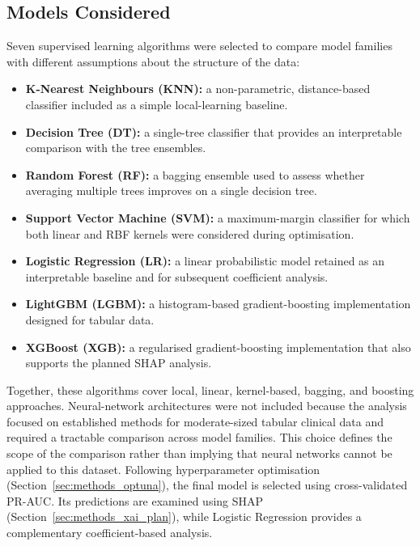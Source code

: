 \subsection{Models Considered}
\label{sec:methods_models}
Seven supervised learning algorithms were selected to compare model families with different assumptions about the structure of the data:
\begin{itemize}
  \item \textbf{K-Nearest Neighbours (\gls{KNN}):} a non-parametric, distance-based classifier included as a simple local-learning baseline.
  \item \textbf{Decision Tree (\gls{DT}):} a single-tree classifier that provides an interpretable comparison with the tree ensembles.
  \item \textbf{Random Forest (\gls{RF}):} a bagging ensemble used to assess whether averaging multiple trees improves on a single decision tree.
  \item \textbf{Support Vector Machine (\gls{SVM}):} a maximum-margin classifier for which both linear and \gls{RBF} kernels were considered during optimisation.
  \item \textbf{Logistic Regression (\gls{LR}):} a linear probabilistic model retained as an interpretable baseline and for subsequent coefficient analysis.
  \item \textbf{LightGBM (\gls{LGBM}):} a histogram-based gradient-boosting implementation designed for tabular data.
  \item \textbf{XGBoost (\gls{XGB}):} a regularised gradient-boosting implementation that also supports the planned \gls{SHAP} analysis.
\end{itemize}
Together, these algorithms cover local, linear, kernel-based, bagging, and boosting approaches. Neural-network architectures were not included because the analysis focused on established methods for moderate-sized tabular clinical data and required a tractable comparison across model families. This choice defines the scope of the comparison rather than implying that neural networks cannot be applied to this dataset.
Following hyperparameter optimisation (Section~\ref{sec:methods_optuna}), the final model is selected using cross-validated \gls{PR-AUC}. Its predictions are examined using \gls{SHAP} (Section~\ref{sec:methods_xai_plan}), while Logistic Regression provides a complementary coefficient-based analysis.

